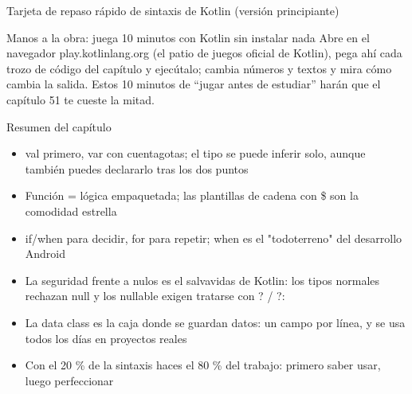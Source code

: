 \begin{center}\small\color{gray}Tarjeta de repaso rápido de sintaxis de Kotlin (versión principiante)\end{center}

\begin{tcbpractice}{Manos a la obra: juega 10 minutos con Kotlin sin instalar nada}
Abre en el navegador play.kotlinlang.org (el patio de juegos oficial de Kotlin), pega ahí cada trozo de código del capítulo y ejecútalo; cambia números y textos y mira cómo cambia la salida. Estos 10 minutos de “jugar antes de estudiar” harán que el capítulo 51 te cueste la mitad.

\end{tcbpractice}

\begin{tcbsummary}{Resumen del capítulo}
\begin{itemize}
  \item val primero, var con cuentagotas; el tipo se puede inferir solo, aunque también puedes declararlo tras los dos puntos
  \item Función = lógica empaquetada; las plantillas de cadena con \$ son la comodidad estrella
  \item if/when para decidir, for para repetir; when es el "todoterreno" del desarrollo Android
  \item La seguridad frente a nulos es el salvavidas de Kotlin: los tipos normales rechazan null y los nullable exigen tratarse con ? / ?:
  \item La data class es la caja donde se guardan datos: un campo por línea, y se usa todos los días en proyectos reales
  \item Con el 20 \% de la sintaxis haces el 80 \% del trabajo: primero saber usar, luego perfeccionar
\end{itemize}

\end{tcbsummary}
